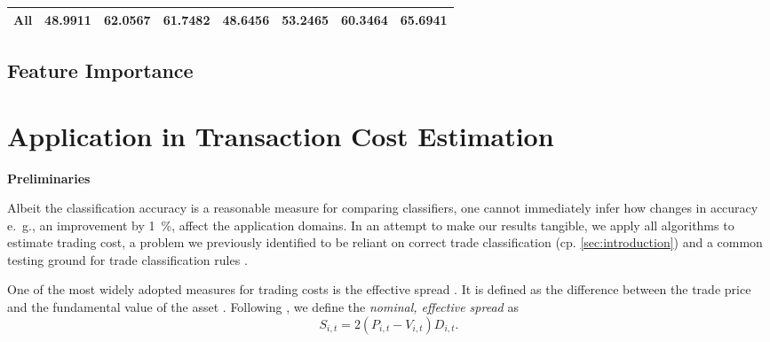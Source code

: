 \begin{table}[H]
\begin{tabular}{lSSSSSSS@{}}
        \tabindent All          & 48.9911                               & 62.0567                                & 61.7482                             & 48.6456                              & 53.2465                               & 60.3464                                 & 65.6941                                 \\
        \bottomrule
    \end{tabular}
\end{table}

\subsection{Feature Importance}\label{sec:feature-importance}

\newpage
\section{Application in Transaction Cost Estimation}\label{sec:application}

\textbf{Preliminaries}


Albeit the classification accuracy is a reasonable measure for comparing classifiers, one cannot immediately infer how changes in accuracy e.~g., an improvement by \SI{1}{\percent}, affect the application domains. In an attempt to make our results tangible, we apply all algorithms to estimate trading cost, a problem we previously identified to be reliant on correct trade classification (cp. \cref{sec:introduction}) and a common testing ground for trade classification rules \autocites[cp.][541]{ellisAccuracyTradeClassification2000}[][569]{finucaneDirectTestMethods2000}[][271--278]{petersonEvaluationBiasesExecution2003}[][896--897]{savickasInferringDirectionOption2003}.

One of the most widely adopted measures for trading costs is the effective spread \autocite[][112]{Piwowar_2006}. It is defined as the difference between the trade price and the fundamental value of the asset \autocite[][238--239]{bessembinderIssuesAssessingTrade2003}. Following \textcite[][238--239]{bessembinderIssuesAssessingTrade2003}, we define the \emph{nominal, effective spread} as
\begin{equation}
    S_{i,t} = 2 (P_{i,t} - V_{i,t}) D_{i,t}.
    \label{eq:effective-spread}
\end{equation}

